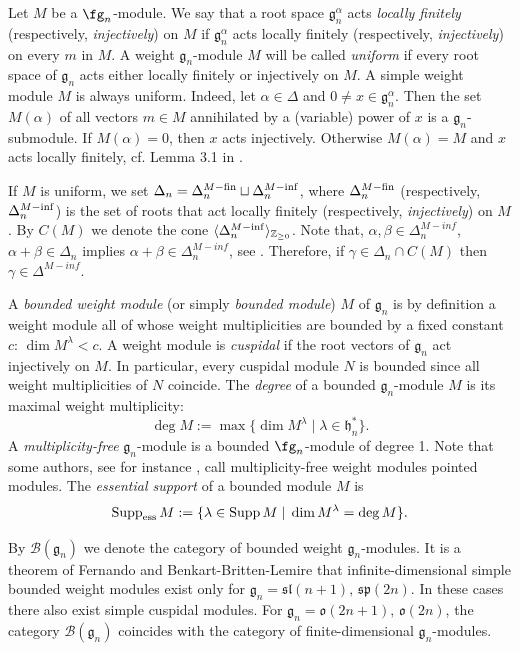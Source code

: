 \documentclass[12pt]{amsart}
\def\gg{\mathfrak{g}}
\def\gh{\mathfrak{h}}
\def\gh{\mathfrak h}
\begin{document}
Let $M$ be a $\fg_n$-module.  We say that a root space $\gg_n^{\alpha}$ acts {\it locally finitely} (respectively, {\it injectively}) on  $M$ if  $\gg_n^{\alpha}$ acts {locally finitely} (respectively, {\it injectively}) on every $m$ in $M$. A weight $\gg_n$-module $M$ will be called  \emph{uniform}  if every root space of $\gg_n$ acts either locally finitely or injectively on $M$. A simple weight module $M$ is always uniform. Indeed, let $\alpha \in \Delta$ and  $0 \neq x \in \gg_n^{\alpha}$. Then the set $M(\alpha)$ of all vectors $m \in M$ annihilated by a (variable) power of $x$ is a $\gg_n$-submodule. If $M(\alpha) = 0$, then $x$ acts injectively. Otherwise $M(\alpha) = M$ and $x$ acts locally finitely, cf. Lemma 3.1  in \cite{DMP}. 



If $M$  is uniform,  we set $\Delta_n = \Delta_n^{M{\rm-fin}} \sqcup \Delta_n^{M{\rm-inf}}$, where $ \Delta_n^{M{\rm-fin}}$ (respectively,  $\Delta_n^{M{\rm-inf}}$) is the set of roots that act {locally finitely} (respectively, {\it injectively}) on $M$. By $C(M)$ we denote the cone $\langle \Delta_n^{M{\rm-inf}}\rangle_{\mathbb Z_{\geq 0}}$.  Note that, $\alpha,\beta\in\Delta_n^{M-inf}$, $\alpha+\beta\in\Delta_n$ implies $\alpha+\beta\in\Delta_n^{M-inf}$, see \cite{DMP}. Therefore, if $\gamma\in\Delta_n\cap C(M)$ then $\gamma\in\Delta^{M-inf}$.


A {\it bounded weight module} (or simply \emph{bounded module}) $M$ of $\gg_n$ is by definition a weight module all of whose weight multiplicities are bounded by a fixed constant $c$: $\dim M^{\lambda} < c$. A weight module is {\it cuspidal} if the root vectors of $\gg_n$ act injectively on $M$. In particular, every cuspidal module $N$  is bounded since all weight multiplicities of $N$ coincide. The {\it degree} of a bounded $\gg_n$-module $M$ is its maximal weight multiplicity:
$$
\deg M := \max \{\dim M^{\lambda} \; | \; \lambda \in \gh_n^*\}.
$$
A \emph{multiplicity-free} $\mathfrak{g}_n$-module is a bounded $\fg_n$-module of degree 1. Note that some authors, see for instance \cite{BBL}, \cite{BL1} call multiplicity-free weight modules pointed modules. 
The {\it essential support} of a bounded module $M$ is 
$$
{\rm Supp}_{\rm ess}\,M := \{ \lambda \in {\rm Supp}\, M \; | \; \dim M^{\lambda} = \deg M \}.
$$  

By ${\mathcal B} (\gg_n)$ we denote the category of bounded weight $\gg_n$-modules. 
It is a theorem of Fernando \cite{Fe} and Benkart-Britten-Lemire \cite{BBL} that infinite-dimensional simple bounded weight modules exist only for $\mathfrak{g}_n=\mathfrak{sl}({n+1}),\,\mathfrak{sp}({2n})$. In these cases there also exist simple cuspidal modules. For $\mathfrak{g}_n=\mathfrak{o}({2n+1}),\,\mathfrak{o}({2n})$, the category $\mathcal{B}(\mathfrak{g}_n)$ coincides with the category of finite-dimensional $\mathfrak{g}_n$-modules.
\end{document}
